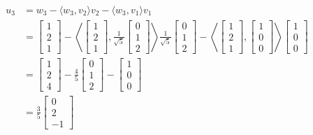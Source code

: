 \documentclass[11pt,letterpaper]{article}
\begin{document}
\begin{align*}
    u_3&=w_3-\langle w_3,v_2 \rangle v_2 -\langle w_3,v_1 \rangle v_1\\
    &=\begin{bmatrix} 1\\2\\1 \end{bmatrix}-\left\langle \begin{bmatrix} 1\\2\\1 \end{bmatrix},\frac{1}{\sqrt{5}}\begin{bmatrix} 0\\1\\2 \end{bmatrix} \right\rangle \frac{1}{\sqrt{5}}\begin{bmatrix} 0\\1\\2 \end{bmatrix}
    -\left\langle \begin{bmatrix} 1\\2\\1 \end{bmatrix},\begin{bmatrix} 1\\0\\0 \end{bmatrix} \right\rangle \begin{bmatrix} 1\\0\\0 \end{bmatrix}\\
    &=\begin{bmatrix} 1\\2\\4 \end{bmatrix}-\frac{4}{5}\begin{bmatrix} 0\\1\\2 \end{bmatrix}-\begin{bmatrix} 1\\0\\0 \end{bmatrix}\\
    &=\frac{3}{5}\begin{bmatrix} 0\\2\\-1 \end{bmatrix}
\end{align*}
\end{document}
